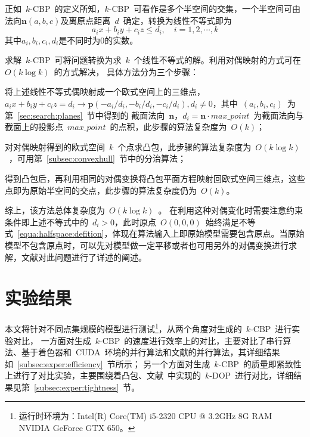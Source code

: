 正如~$k$-CBP~的定义所知，$k$-CBP~可看作是多个半空间的交集，一个半空间可由法向$\bm{n}(a,b,c)$及离原点距离~$d$~确定，转换为线性不等式即为
\begin{equation}
  \label{equa:halfspace:defition}
  a_ix+b_iy+c_iz \leq d_i, \quad i=1,2,\cdots,k
\end{equation}
其中$a_i,b_i,c_i,d_i$是不同时为0的实数。

求解~$k$-CBP~可将问题转换为求~$k$~个线性不等式的解。利用对偶映射的方式可在~$O(k \log k)$~的方式解决，
具体方法分为三个步骤\cite{Preparata1985Introduction}：
\\ \indent
\begin{inparaenum}[(1)]
\item   
将上述线性不等式偶映射成一个欧式空间上的三维点，
$a_ix+b_iy+c_iz=d_i \rightarrow \bm{p}(-a_i/d_i, -b_i/d_i,-c_i/d_i),d_i \neq 0$，其中~$(a_i,b_i,c_i)$~为第~\ref{sec:search:planes}~节中得到的
截面法向~$\bm{n}$，$d_i=\bm{n} \cdot
max\_point$~为截面法向与截面上的投影点~$max\_point$~的点积，此步骤的算法复杂度为~$O(k)$； \\ \indent
\item
  对对偶映射得到的欧式空间~$k$~个点求凸包，此步骤的算法复杂度为~$O(k\log k)$~，可用第~\ref{subsec:convexhull}~节中的分治算法； \\ \indent
\item
  得到凸包后，再利用相同的对偶变换将凸包平面方程映射回欧式空间三维点，这些点即为原始半空间的交点，此步骤的算法复杂度仍为~$O(k)$。
\end{inparaenum}

综上，该方法总体复杂度为~$O(k\log k)$~。
在利用这种对偶变化时需要注意约束条件即上述不等式中的~$d_i>0$，此时原点~$O(0,0,0)$~始终满足不等式~\ref{equa:halfspace:defition}，体现在算法输入上即原始模型需要包含原点。当原始模型不包含原点时，可以先对模型做一定平移或者也可用另外的对偶变换进行求解，文献对此问题进行了详述的阐述。

\section{实验结果}
\label{sec:exper-kcbp}

本文将针对不同点集规模的模型进行测试\footnote{运行时环境为：Intel(R) Core(TM)
i5-2320 CPU @ 3.2GHz 8G RAM NVIDIA GeForce GTX
650。}，从两个角度对生成的~$k$-CBP~进行实验对比，
一方面对生成~$k$-CBP~的速度进行效率上的对比，主要对比了串行算法、基于着色器和~CUDA~环境的并行算法和文献的并行算法，其详细结果如~\ref{subsec:exper:efficiency}~节所示；
另一个方面对生成~$k$-CBP~的质量即紧致性上进行了对比实验，主要围绕着凸包、文献~中实现的~$k$-DOP~进行对比，详细结果见第~\ref{subsec:exper:tightness}~节。

